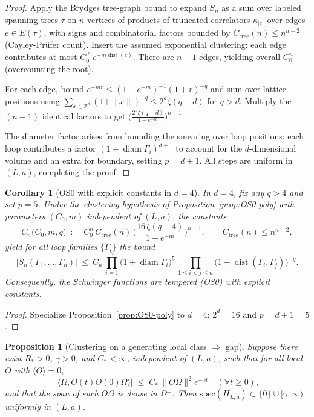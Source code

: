 \documentclass[11pt]{amsart}
\theoremstyle{plain}
\newtheorem{proposition}[theorem]{Proposition}
\newtheorem{corollary}[theorem]{Corollary}
\theoremstyle{definition}
\theoremstyle{remark}
\begin{document}
\begin{proof}
Apply the Brydges tree-graph bound \cite{Brydges1978} to expand $S_n$ as a sum over labeled spanning trees $\tau$ on $n$ vertices of products of truncated correlators $\kappa_{|e|}$ over edges $e\in E(\tau)$, with signs and combinatorial factors bounded by $C_{\mathrm{tree}}(n)\le n^{n-2}$ (Cayley-Prüfer count). Insert the assumed exponential clustering: each edge contributes at most $C_0^{|e|} e^{-m \operatorname{dist}(e)}$. There are $n-1$ edges, yielding overall $C_0^n$ (overcounting the root).

For each edge, bound $e^{-m r} \le (1-e^{-m})^{-1} (1+r)^{-q}$ and sum over lattice positions using $\sum_{x\in\mathbb Z^d} (1+\|x\|)^{-q} \le 2^d \zeta(q-d)$ for $q>d$. Multiply the $(n-1)$ identical factors to get $\bigl(\frac{2^d \zeta(q-d)}{1-e^{-m}}\bigr)^{n-1}$.

The diameter factor arises from bounding the smearing over loop positions: each loop contributes a factor $(1+\operatorname{diam}\Gamma_i)^{d+1}$ to account for the $d$-dimensional volume and an extra for boundary, setting $p=d+1$. All steps are uniform in $(L,a)$, completing the proof.
\end{proof}

\begin{corollary}[OS0 with explicit constants in $d=4$]\label{cor:os0-explicit-4d}
In $d=4$, fix any $q>4$ and set $p=5$. Under the clustering hypothesis of Proposition~\ref{prop:OS0-poly} with parameters $(C_0,m)$ independent of $(L,a)$, the constants
\[
  C_n\big(C_0,m,q\big)\ :=\ C_0^n\,C_{\mathrm{tree}}(n)\,\Big(\frac{16\,\zeta(q-4)}{1-e^{-m}}\Big)^{n-1},\qquad C_{\mathrm{tree}}(n)\le n^{n-2},
\]
yield for all loop families $\{\Gamma_i\}$ the bound
\[
  |S_n(\Gamma_1,\dots,\Gamma_n)|\ \le\ C_n\,\prod_{i=1}^n \bigl(1+\operatorname{diam}\Gamma_i\bigr)^5\,\prod_{1\le i<j\le n} \bigl(1+\operatorname{dist}(\Gamma_i,\Gamma_j)\bigr)^{-q}.
\]
Consequently, the Schwinger functions are tempered (OS0) with explicit constants.
\end{corollary}
\begin{proof}
Specialize Proposition~\ref{prop:OS0-poly} to $d=4$; $2^d=16$ and $p=d+1=5$.
\end{proof}

\begin{proposition}[Clustering on a generating local class $\Rightarrow$ gap]\label{prop:cluster-to-gap}
Suppose there exist $R_*>0$, $\gamma>0$, and $C_*<\infty$, independent of $(L,a)$, such that for all local $O$ with $\langle O\rangle=0$,
\[
  |\langle\Omega, O(t)O(0)\Omega\rangle|\;\le\; C_*\,\|O\Omega\|^2 e^{-\gamma t}\quad(\forall t\ge 0),
\]
and that the span of such $O\Omega$ is dense in $\Omega^\perp$. Then $\mathrm{spec}(H_{L,a})\subset\{0\}\cup[\gamma,\infty)$ uniformly in $(L,a)$.
\end{proposition}
\end{document}
